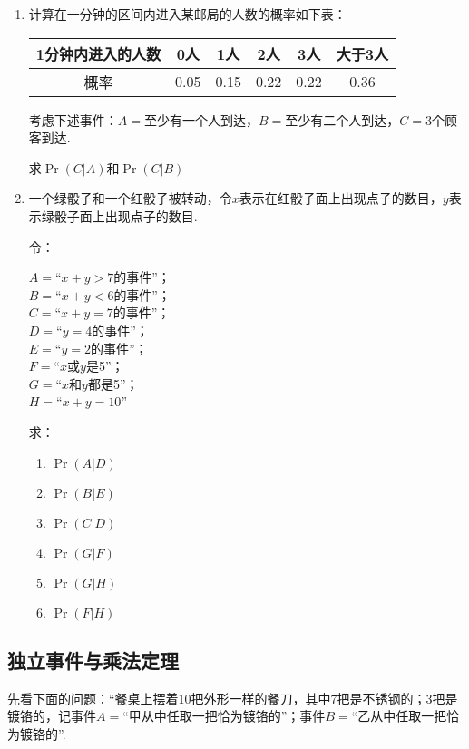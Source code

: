 \begin{ex}
\begin{enumerate}
    \item 计算在一分钟的区间内进入某邮局的人数的概率如下表：
\begin{center}
\begin{tabular}{cccccc}
\hline
    1分钟内进入的人数&0人&1人&2人&3人&大于3人\\
\hline
概率&0.05&0.15&0.22&0.22&0.36\\
\hline
\end{tabular}
\end{center}    
考虑下述事件：$A=$至少有一个人到达，$B=$至少有二个人到达，$C=$3个顾客到达.

求$\Pr(C|A)$和$\Pr(C|B)$
\item 一个绿骰子和一个红骰子被转动，令$x$表示在红骰子面上出现点子的数目，$y$表示绿骰子面上出现点子的数目.

令：
\begin{multicols}{2}
    $A=$“$x+y>7$的事件”；
    \\
    $B=$“$x+y<6$的事件”；
    \\
    $C=$“$x+y=7$的事件”；\\$D=$“$y=4$的事件”；\\
$E=$“$y=2$的事件”；\\$F=$“$x$或$y$是5”；\\$G=$“$x$和$y$都是5”；\\$H=$“$x+y=10$”
\end{multicols}
求：
\begin{multicols}{3}
 \begin{enumerate}[(1)]
    \item $\Pr(A|D)$
    \item $\Pr(B|E)$
    \item $\Pr(C|D)$
    \item $\Pr(G|F)$
    \item $\Pr(G|H)$
    \item $\Pr(F|H)$
\end{enumerate}   
\end{multicols}
\end{enumerate}
\end{ex}

\subsection{独立事件与乘法定理}
先看下面的问题：“餐桌上摆着10把外形一样的餐刀，其中7把是不锈钢的；3把是镀铬的，记事件$A=$“甲从中任取一把恰为镀铬的”；事件$B=$“乙从中任取一把恰为镀铬的”.

